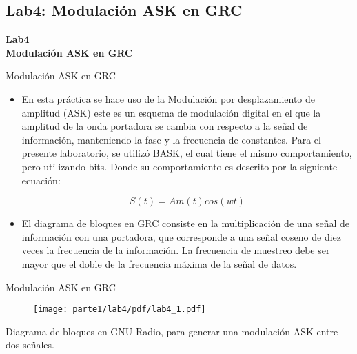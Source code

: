 \subsection{Lab4: Modulación ASK en GRC}

\begin{frame}{}


\bfseries{\textrm{\LARGE Lab4\\ \Large Modulación ASK en GRC}}
\raggedright
\end{frame}


\begin{frame}{Modulación ASK en GRC}



  \begin{itemize}
  \item {
En esta práctica se hace uso de la  Modulación por desplazamiento de amplitud (ASK) este es un esquema de modulación digital en el que la amplitud de la onda portadora se cambia con respecto a la señal de información, manteniendo la fase y la frecuencia de constantes. Para el presente laboratorio, se utilizó BASK, el cual tiene el mismo comportamiento, pero utilizando bits. Donde su comportamiento es descrito por la siguiente ecuación:

\begin{equation*}
S(t) = Am(t)cos(wt)
\end{equation*}

  }
  \item {
El diagrama de bloques en GRC consiste en la multiplicación de una señal de información con una portadora, que corresponde a una señal coseno de diez veces la frecuencia de la información. La frecuencia de muestreo debe ser mayor que el doble de la frecuencia máxima de la señal de datos.
  }
  \end{itemize}
\end{frame}

\begin{frame}{Modulación ASK en GRC}

\begin{figure}[H]
\centering
\texttt{[image: parte1/lab4/pdf/lab4\_1.pdf]}
\end{figure}
Diagrama de bloques en GNU Radio, para generar una modulación ASK entre dos señales.
\end{frame}

